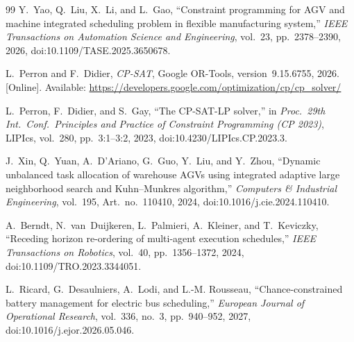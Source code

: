 \begin{thebibliography}{99}
Y.~Yao, Q.~Liu, X.~Li, and L.~Gao, ``Constraint programming for AGV and machine integrated scheduling
problem in flexible manufacturing system,'' \emph{IEEE Transactions on Automation Science and
Engineering}, vol.~23, pp.~2378--2390, 2026, doi:10.1109/TASE.2025.3650678.

L.~Perron and F.~Didier, \emph{CP-SAT}, Google OR-Tools, version~9.15.6755, 2026. [Online].
Available: \url{https://developers.google.com/optimization/cp/cp_solver/}

L.~Perron, F.~Didier, and S.~Gay, ``The CP-SAT-LP solver,'' in \emph{Proc.\ 29th Int.\ Conf.\
Principles and Practice of Constraint Programming (CP 2023)}, LIPIcs, vol.~280, pp.~3:1--3:2, 2023,
doi:10.4230/LIPIcs.CP.2023.3.

J.~Xin, Q.~Yuan, A.~D'Ariano, G.~Guo, Y.~Liu, and Y.~Zhou, ``Dynamic unbalanced task allocation of
warehouse AGVs using integrated adaptive large neighborhood search and Kuhn--Munkres algorithm,''
\emph{Computers \& Industrial Engineering}, vol.~195, Art.~no.~110410, 2024,
doi:10.1016/j.cie.2024.110410.

A.~Berndt, N.~van~Duijkeren, L.~Palmieri, A.~Kleiner, and T.~Keviczky, ``Receding horizon re-ordering
of multi-agent execution schedules,'' \emph{IEEE Transactions on Robotics}, vol.~40, pp.~1356--1372,
2024, doi:10.1109/TRO.2023.3344051.

L.~Ricard, G.~Desaulniers, A.~Lodi, and L.-M. Rousseau, ``Chance-constrained battery management for
electric bus scheduling,'' \emph{European Journal of Operational Research}, vol.~336, no.~3,
pp.~940--952, 2027, doi:10.1016/j.ejor.2026.05.046.

\end{thebibliography}
